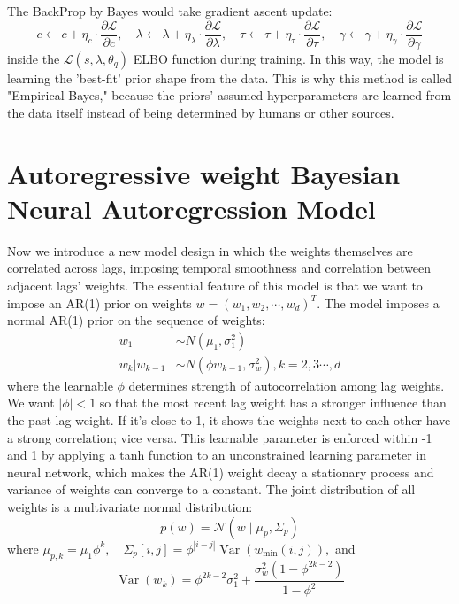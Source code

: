 \documentclass{article}
\begin{document}
The BackProp by Bayes would take gradient ascent update: $$c \leftarrow c + \eta_c \cdot\frac{\partial \mathcal{L}}{\partial c}, \quad \lambda \leftarrow \lambda + \eta_{\lambda} \cdot\frac{\partial \mathcal{L}}{\partial \lambda},\quad \tau \leftarrow \tau + \eta_{\tau} \cdot\frac{\partial \mathcal{L}}{\partial \tau},\quad \gamma \leftarrow \gamma + \eta_{\gamma} \cdot\frac{\partial \mathcal{L}}{\partial \gamma}$$ inside the $\mathcal{L}(s, \lambda, \theta_q)$ ELBO function during training. In this way, the model is learning the 'best-fit' prior shape from the data. This is why this method is called "Empirical Bayes," because the priors' assumed hyperparameters are learned from the data itself instead of being determined by humans or other sources. 

\section{Autoregressive weight Bayesian Neural Autoregression Model}
Now we introduce a new model design in which the weights themselves are correlated across lags, imposing temporal smoothness and correlation between adjacent lags' weights. The essential feature of this model is that we want to impose an AR(1) prior on weights $w=(w_1, w_2, \cdots, w_d)^T$. The model imposes a normal AR(1) prior on the sequence of weights: $$\begin{aligned}
    w_1 &\sim N(\mu_1, \sigma_1^2) \\
    w_k|w_{k-1} &\sim N(\phi w_{k-1},\sigma_w^2), k=2,3\cdots,d
\end{aligned}$$ where the learnable $\phi$ determines strength of autocorrelation among lag weights. We want $|\phi|<1$ so that the most recent lag weight has a stronger influence than the past lag weight. If it's close to 1, it shows the weights next to each other have a strong correlation; vice versa. This learnable parameter is enforced within -1 and 1 by applying a tanh function to an unconstrained learning parameter in neural network, which makes the AR(1) weight decay a stationary process and variance of weights can converge to a constant. 
The joint distribution of all weights is a multivariate normal distribution:
$$p(w)=\mathcal{N}\left(w \mid \mu_p, \Sigma_p\right)$$
where $\mu_{p, k}=\mu_1 \phi^k, \quad \Sigma_p[i, j]=\phi^{|i-j|} \operatorname{Var}\left(w_{\min }(i, j)\right),$ and 
$$\operatorname{Var}\left(w_k\right)=\phi^{2 k-2} \sigma_1^2+\frac{\sigma_w^2\left(1-\phi^{2 k-2}\right)}{1-\phi^2}$$
\end{document}
